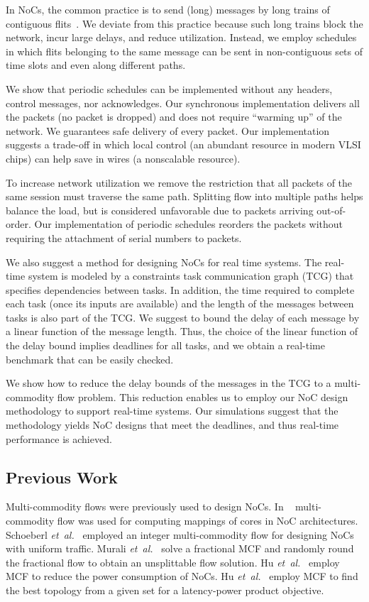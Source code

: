\documentclass[a4paper,12pt]{article}
\newenvironment{proof sketch}[1]{\noindent {\emph{Proof sketch of #1:}}}{\hfill \qed}
\newcommand{\etal}{{\it et~al.}}
\begin{document}
In NoCs, the common practice is to send (long) messages by long trains of contiguous
flits~\cite{goossens2010aethereal}.  We deviate from this practice because such long
trains block the network, incur large delays, and reduce  utilization. Instead, we
employ schedules in which flits belonging to the same message can be sent in
non-contiguous sets of time slots and even along different paths.

We show that periodic schedules can be implemented without any headers, control
messages, nor acknowledges. Our synchronous implementation delivers all the packets
(no packet is dropped) and does not require ``warming up'' of the network. We
guarantees safe delivery of every packet. Our implementation suggests a trade-off in
which local control (an abundant resource in modern VLSI chips) can help save in wires
(a nonscalable resource).

To increase network utilization we remove the restriction that all packets of the same
session must  traverse the same path.  Splitting flow into multiple paths helps
balance the load, but is considered unfavorable due to packets arriving
out-of-order. Our implementation of periodic schedules reorders the packets without
requiring the attachment of serial numbers to packets.

We also suggest a method for designing NoCs for real time systems. The real-time
system is modeled by a constraints task communication graph (TCG) that specifies
dependencies between tasks. In addition, the time required to complete
each task (once its inputs are available) and the length of the messages between
tasks is also part of the TCG. We suggest to bound the delay of each message by a
linear function of the message length. Thus, the choice of the linear function of the delay
bound implies deadlines for all tasks, and we obtain a real-time benchmark that can be
easily checked.

We show how to reduce the delay bounds of the messages in the TCG to a
multi-commodity flow problem. This reduction enables us to employ our NoC design
methodology to support real-time systems. Our simulations suggest that the
methodology yields NoC designs that meet the deadlines, and thus real-time
performance is achieved.

\subsection{Previous Work}

Multi-commodity flows were previously used to design NoCs. In
~\cite{murali2004bandwidth,bertozzi2005noc} multi-commodity flow was used for
computing mappings of cores in NoC architectures.  Schoeberl \etal\
\cite{schoeberl2012statically} employed an integer multi-commodity flow for designing
NoCs with uniform traffic. Murali \etal~\cite{murali2006multi} solve a fractional MCF
and  randomly round the fractional flow to obtain an unsplittable flow solution. Hu
\etal~\cite{hu2005physical} employ MCF to reduce the power consumption of NoCs.
Hu \etal~\cite{hu2006communication} employ MCF to find the best topology from a
given set for a latency-power product objective.
\end{document}
